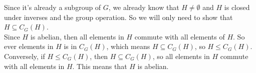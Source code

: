 \documentclass[12pt]{article}
\begin{document}
\begin{enumerate}[label=\textbf{\alph*.}]
            Since it's already a subgroup of $G$,
            we already know that $H \neq \emptyset$
            and $H$ is closed under inverses and the group operation.
            So we will only need to show that $H \subseteq C_G(H)$. \\
            Since $H$ is abelian, then all elements in $H$
            commute with all elements of $H$.
            So ever elements in $H$ is in $C_G(H)$,
            which means $H \subseteq C_G(H)$,
            so $H \leqslant C_G(H)$. \\
            Conversely, if $H \leqslant C_G(H)$,
            then $H \subseteq C_G(H)$,
            so all elements in $H$ commute with all elements in $H$.
            This means that $H$ is abelian.
    \end{enumerate} 
\end{document}
